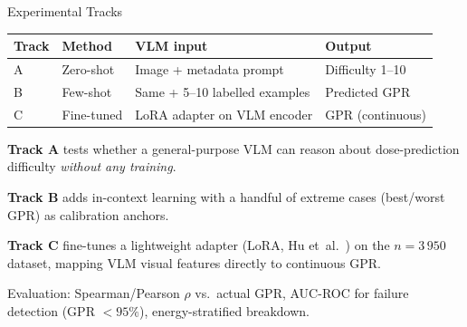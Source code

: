 \documentclass[aspectratio=169, 10pt]{beamer}
\begin{document}
\begin{frame}{Experimental Tracks}
  \begin{center}
  \renewcommand{\arraystretch}{1.3}
  {\small
  \begin{tabular}{@{}l l l l@{}}
    \toprule
    \textbf{Track} & \textbf{Method} & \textbf{VLM input} & \textbf{Output} \\
    \midrule
    A & Zero-shot  & Image + metadata prompt
      & Difficulty 1--10 \\
    B & Few-shot   & Same + 5--10 labelled examples
      & Predicted GPR \\
    C & Fine-tuned & LoRA adapter on VLM encoder
      & GPR (continuous) \\
    \bottomrule
  \end{tabular}
  }
  \end{center}

  \vspace{6pt}
  \textbf{Track A} tests whether a general-purpose VLM can reason about
  dose-prediction difficulty \emph{without any training}.

  \textbf{Track B} adds in-context learning with a handful of extreme
  cases (best/worst GPR) as calibration anchors.

  \textbf{Track C} fine-tunes a lightweight adapter (LoRA,
  Hu et~al.~\cite{hu2022lora}) on the $n{=}3\,950$ dataset, mapping
  VLM visual features directly to continuous GPR.

  \vspace{4pt}
  {\small Evaluation: Spearman/Pearson $\rho$ vs.\ actual GPR,
  AUC-ROC for failure detection (GPR $< 95\%$), energy-stratified
  breakdown.}
\end{frame}
\end{document}
